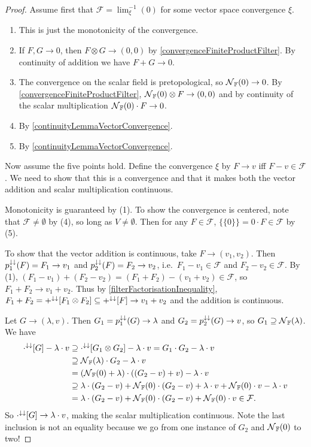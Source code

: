 \begin{proof}
Assume first that $\mathcal{F} = \lim^{-1}_\xi(0)$ for some vector space convergence $\xi$.
\begin{enumerate}
\item This is just the monotonicity of the convergence.
\item If $F,G\to 0$, then $F\otimes G \to (0,0)$ by \ref{convergenceFiniteProductFilter}. By continuity of addition we have $F+G\to 0$.
\item The convergence on the scalar field is pretopological, so $\operatorname{\mathcal{N}}_{\mathbb{F}}(0)\to 0$. By \ref{convergenceFiniteProductFilter}, $\operatorname{\mathcal{N}}_{\mathbb{F}}(0)\otimes F \to (0,0)$ and by continuity of the scalar multiplication $\operatorname{\mathcal{N}}_{\mathbb{F}}(0)\cdot F \to 0$.
\item By \ref{continuityLemmaVectorConvergence}.
\item By \ref{continuityLemmaVectorConvergence}.
\end{enumerate}

Now assume the five points hold. Define the convergence $\xi$ by $F\to v$ iff $F-v \in \mathcal{F}$. We need to show that this is a convergence and that it makes both the vector addition and scalar multiplication continuous.

Monotonicity is guaranteed by (1). To show the convergence is centered, note that $\mathcal{F} \neq \emptyset$ by (4), so long as $V\neq \emptyset$. Then for any $F\in \mathcal{F}$, $\big\{\{0\}\big\} = 0\cdot F \in \mathcal{F}$ by (5).

To show that the vector addition is continuous, take $F\to (v_1, v_2)$. Then $p_1^{\downarrow\downarrow}(F) = F_1\to v_1$ and $p_2^{\downarrow\downarrow}(F) = F_2 \to v_2$, i.e.\ $F_1-v_1 \in \mathcal{F}$ and $F_2-v_2 \in \mathcal{F}$. By (1), $(F_1-v_1) + (F_2-v_2) = (F_1+F_2) - (v_1 + v_2) \in \mathcal{F}$, so $F_1+F_2 \to v_1 + v_2$. Thus by \ref{filterFactorisationInequality}, $F_1+F_2 = +^{\downarrow\downarrow}[F_1\otimes F_2] \subseteq +^{\downarrow\downarrow}[F] \to v_1+v_2$ and the addition is continuous.

Let $G \to (\lambda, v)$. Then $G_1 = p_1^{\downarrow\downarrow}(G) \to \lambda$ and $G_2 = p_2^{\downarrow\downarrow}(G) \to v$, so $G_1 \supseteq \operatorname{\mathcal{N}}_{\mathbb{F}}(\lambda)$. We have
\begin{align*}
\cdot^{\downarrow\downarrow}[G] - \lambda\cdot v &\supseteq \cdot^{\downarrow\downarrow}[G_1\otimes G_2] - \lambda\cdot v = G_1\cdot G_2 - \lambda\cdot v \\
&\supseteq \operatorname{\mathcal{N}}_{\mathbb{F}}(\lambda) \cdot G_2 - \lambda\cdot v \\
&= (\operatorname{\mathcal{N}}_{\mathbb{F}}(0) + \lambda)\cdot((G_2 - v) + v) - \lambda\cdot v \\
&\supseteq \lambda\cdot (G_2 - v) + \operatorname{\mathcal{N}}_{\mathbb{F}}(0)\cdot(G_2-v) + \lambda\cdot v + \operatorname{\mathcal{N}}_{\mathbb{F}}(0)\cdot v - \lambda\cdot v \\
&= \lambda\cdot (G_2 - v) + \operatorname{\mathcal{N}}_{\mathbb{F}}(0)\cdot(G_2-v) + \operatorname{\mathcal{N}}_{\mathbb{F}}(0)\cdot v \in \mathcal{F}.
\end{align*}
So $\cdot^{\downarrow\downarrow}[G] \to \lambda\cdot v$, making the scalar multiplication continuous. Note the last inclusion is not an equality because we go from one instance of $G_2$ and $\operatorname{\mathcal{N}}_{\mathbb{F}}(0)$ to two!
\end{proof}
